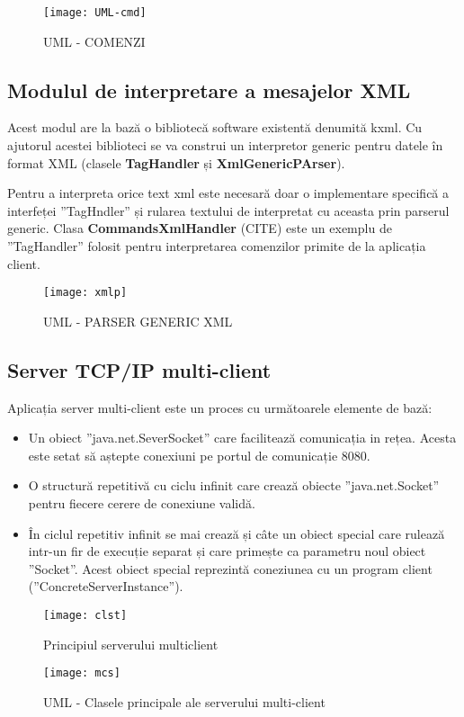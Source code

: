 \begin{figure}[h]
    \centering
    \texttt{[image: UML-cmd]}
    \caption{UML - COMENZI}
    \label{fig:imag7}
\end{figure}

\subsection{Modulul de interpretare a mesajelor XML}
\par Acest modul are la bază o bibliotecă software existentă denumită kxml. Cu ajutorul acestei biblioteci se va construi un interpretor generic pentru datele în format XML (clasele \textbf{TagHandler} și \textbf{XmlGenericPArser}).
\par Pentru a interpreta orice text xml este necesară doar o implementare specifică a interfeței ”TagHndler” și rularea textului de interpretat cu aceasta prin parserul generic. Clasa \textbf{CommandsXmlHandler} (CITE) este un exemplu de ”TagHandler” folosit pentru interpretarea comenzilor primite de la aplicația client.

\begin{figure}[h]
    \centering
    \texttt{[image: xmlp]}
    \caption{UML - PARSER GENERIC XML}
    \label{fig:imag7}
\end{figure}

\subsection{Server TCP/IP multi-client}
\par Aplicația server multi-client este un proces cu următoarele elemente de bază:
\begin{itemize}
\item Un obiect ”java.net.SeverSocket” care facilitează comunicația in rețea. Acesta este setat să aștepte conexiuni pe portul de comunicație 8080.
\item O structură repetitivă cu ciclu infinit care crează obiecte ”java.net.Socket” pentru fiecere cerere de conexiune validă. 
\item În ciclul repetitiv infinit se mai crează și câte un obiect special care rulează intr-un fir de execuție separat și care primește ca parametru noul obiect ”Socket”. Acest obiect special reprezintă coneziunea cu un program client (”ConcreteServerInstance”).
\end{itemize}
\begin{figure}[h]
    \centering
    \texttt{[image: clst]}
    \caption{Principiul serverului multiclient}
    \label{fig:imag8}
\end{figure}
\begin{figure}[h]
    \centering
    \texttt{[image: mcs]}
    \caption{UML - Clasele principale ale serverului multi-client}
    \label{fig:imag9}
\end{figure}

